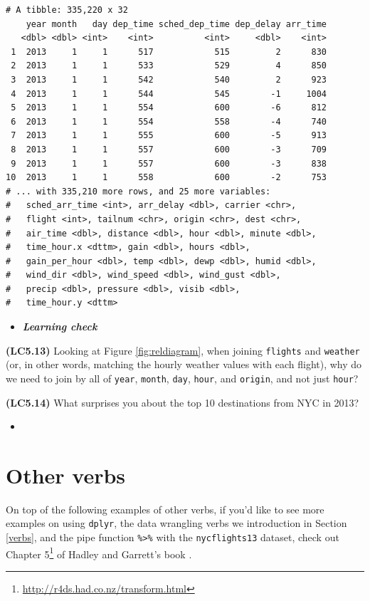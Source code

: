 \documentclass[12pt,]{krantz}
\renewcommand{\href}[2]{#2\footnote{\url{#1}}}
\newenvironment{rmdblock}[1]
  {\begin{shaded*}
  \begin{itemize}
  \renewcommand{\labelitemi}{
    \raisebox{-.7\height}[0pt][0pt]{
    }
  }
  \item
  }
  {
  \end{itemize}
  \end{shaded*}
  }
\newenvironment{learncheck}
  {\begin{rmdblock}{warning}}
  {\end{rmdblock}}
\theoremstyle{definition}
\theoremstyle{definition}
\theoremstyle{definition}
\theoremstyle{remark}
\begin{document}
\begin{verbatim}
# A tibble: 335,220 x 32
    year month   day dep_time sched_dep_time dep_delay arr_time
   <dbl> <dbl> <int>    <int>          <int>     <dbl>    <int>
 1  2013     1     1      517            515         2      830
 2  2013     1     1      533            529         4      850
 3  2013     1     1      542            540         2      923
 4  2013     1     1      544            545        -1     1004
 5  2013     1     1      554            600        -6      812
 6  2013     1     1      554            558        -4      740
 7  2013     1     1      555            600        -5      913
 8  2013     1     1      557            600        -3      709
 9  2013     1     1      557            600        -3      838
10  2013     1     1      558            600        -2      753
# ... with 335,210 more rows, and 25 more variables:
#   sched_arr_time <int>, arr_delay <dbl>, carrier <chr>,
#   flight <int>, tailnum <chr>, origin <chr>, dest <chr>,
#   air_time <dbl>, distance <dbl>, hour <dbl>, minute <dbl>,
#   time_hour.x <dttm>, gain <dbl>, hours <dbl>,
#   gain_per_hour <dbl>, temp <dbl>, dewp <dbl>, humid <dbl>,
#   wind_dir <dbl>, wind_speed <dbl>, wind_gust <dbl>,
#   precip <dbl>, pressure <dbl>, visib <dbl>,
#   time_hour.y <dttm>
\end{verbatim}

\begin{learncheck}
\textbf{\emph{Learning check}}
\end{learncheck}

\textbf{(LC5.13)} Looking at Figure \ref{fig:reldiagram}, when joining
\texttt{flights} and \texttt{weather} (or, in other words, matching the
hourly weather values with each flight), why do we need to join by all
of \texttt{year}, \texttt{month}, \texttt{day}, \texttt{hour}, and
\texttt{origin}, and not just \texttt{hour}?

\textbf{(LC5.14)} What surprises you about the top 10 destinations from
NYC in 2013?

\begin{learncheck}

\end{learncheck}

\section{Other verbs}\label{other-verbs}

On top of the following examples of other verbs, if you'd like to see
more examples on using \texttt{dplyr}, the data wrangling verbs we
introduction in Section \ref{verbs}, and the pipe function
\texttt{\%\textgreater{}\%} with the \texttt{nycflights13} dataset,
check out \href{http://r4ds.had.co.nz/transform.html}{Chapter 5} of
Hadley and Garrett's book \citep{rds2016}.
\end{document}
